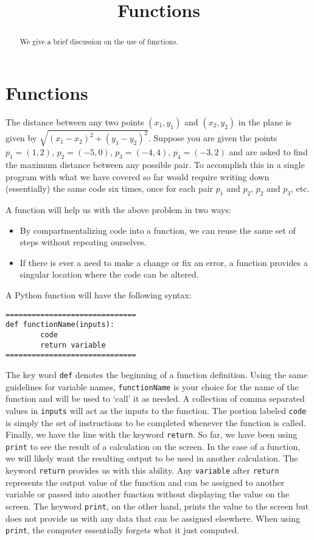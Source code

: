 \documentclass{ximera}
\title{Functions}
\begin{document}
  
\begin{abstract}  
We give a brief discussion on the use of functions.
\end{abstract}  
\maketitle

\section{Functions}

The distance between any two points $(x_1,y_1)$ and $(x_2,y_2)$ in the plane is given by $\sqrt{(x_1-x_2)^2+(y_1-y_2)^2}.$ Suppose you are given the points $p_1=(1,2)$, $p_2=(-5,0)$, $p_3=(-4,4)$, $p_4=(-3,2)$ and are asked to find the maximum distance between any possible pair. To accomplish this in a single program with what we have covered so far would require writing down (essentially) the same code six times, once for each pair $p_1$ and $p_2$, $p_2$ and $p_3$, etc. 

A function will help us with the above problem in two ways:

\begin{itemize}
	\item By compartmentalizing code into a function, we can reuse the same set of steps without repeating ourselves.
	\item If there is ever a need to make a change or fix an error, a function provides a singular location where the code can be altered.
\end{itemize}

A Python function will have the following syntax:

\begin{verbatim}
==============================
def functionName(inputs):
        code
        return variable
==============================
\end{verbatim}

The key word \verb|def| denotes the beginning of a function definition. Using the same guidelines for variable names, \verb|functionName| is your choice for the name of the function and will be used to `call' it as needed. A collection of comma separated values in \verb|inputs| will act as the inputs to the function.  The portion labeled \verb|code| is simply the set of instructions to be completed whenever the function is called. Finally, we have the line with the keyword \verb|return|. So far, we have been using \verb|print| to see the result of a calculation on the screen. In the case of a function, we will likely want the resulting output to be used in another calculation. The keyword \verb|return| provides us with this ability. Any \verb|variable| after \verb|return| represents the output value of the function and can be assigned to another variable or passed into another function without displaying the value on the screen. The keyword \verb|print|, on the other hand, prints the value to the screen but does not provide us with any data that can be assigned elsewhere. When using \verb|print|, the computer essentially forgets what it just computed.
\end{document}
